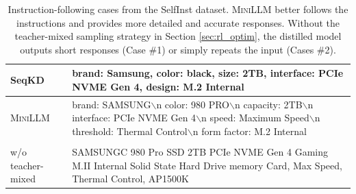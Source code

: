 \documentclass{article}
\begin{document}
\begin{table}[t]
\begin{tabular}{l|p{10.3cm}}
    SeqKD           &  brand: Samsung, color: black, size: 2TB, interface: PCIe NVME Gen 4, design: M.2 Internal \\ \midrule
    \textsc{MiniLLM}  &  brand: SAMSUNG$\backslash$n color: 980 PRO$\backslash$n capacity: 2TB$\backslash$n interface: PCIe NVME Gen 4$\backslash$n speed: Maximum Speed$\backslash$n threshold: Thermal Control$\backslash$n form factor: M.2 Internal \\ \midrule
    \makecell[l]{\textsc{MiniLLM} \\ w/o teacher-mixed} &  SAMSUNGC 980 Pro SSD 2TB PCIe NVME Gen 4 Gaming M.II Internal Solid State Hard Drive memory Card, Max Speed, Thermal Control, AP1500K \\
    \bottomrule
    \end{tabular}
    \vspace{0.4cm}
    \caption{Instruction-following cases from the SelfInst dataset. \textsc{MiniLLM} better follows the instructions and provides more detailed and accurate responses. Without the teacher-mixed sampling strategy in Section \ref{sec:rl_optim}, the distilled model outputs short responses (Case \#1) or simply repeats the input (Cases \#2).}
    \label{tab:cases}
\end{table}
\end{document}
